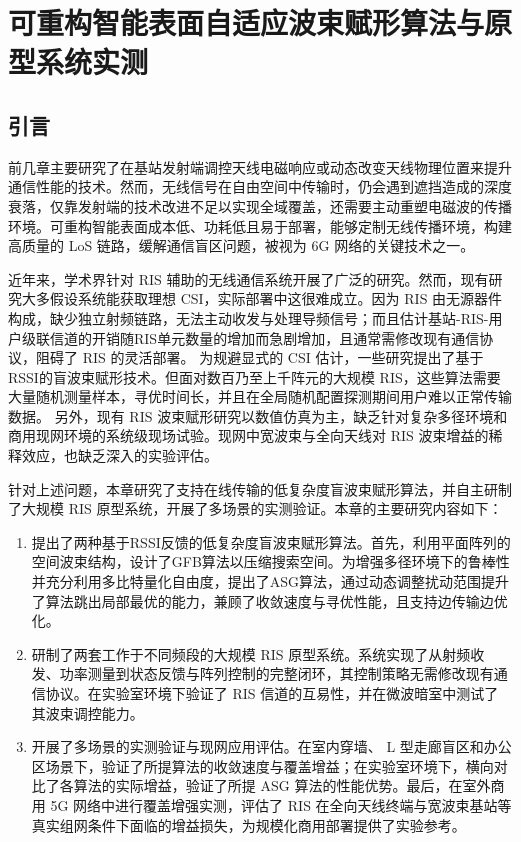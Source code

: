 \chapter{可重构智能表面自适应波束赋形算法与原型系统实测}\label{ch:ris}

\section{引言}\label{sec:ris_intro}

前几章主要研究了在基站发射端调控天线电磁响应或动态改变天线物理位置来提升通信性能的技术。然而，无线信号在自由空间中传输时，仍会遇到遮挡造成的深度衰落，仅靠发射端的技术改进不足以实现全域覆盖，还需要主动重塑电磁波的传播环境。可重构智能表面成本低、功耗低且易于部署，能够定制无线传播环境，构建高质量的 LoS 链路，缓解通信盲区问题，被视为 6G 网络的关键技术之一。

近年来，学术界针对 RIS 辅助的无线通信系统开展了广泛的研究。然而，现有研究大多假设系统能获取理想 CSI，实际部署中这很难成立。因为 RIS 由无源器件构成，缺少独立射频链路，无法主动收发与处理导频信号；而且估计基站-RIS-用户级联信道的开销随RIS单元数量的增加而急剧增加，且通常需修改现有通信协议，阻碍了 RIS 的灵活部署。
为规避显式的 CSI 估计，一些研究提出了基于RSSI的盲波束赋形技术\cite{arun2020rfocus,ren2023configuring}。但面对数百乃至上千阵元的大规模 RIS，这些算法需要大量随机测量样本，寻优时间长，并且在全局随机配置探测期间用户难以正常传输数据。
另外，现有 RIS 波束赋形研究以数值仿真为主，缺乏针对复杂多径环境和商用现网环境的系统级现场试验。现网中宽波束与全向天线对 RIS 波束增益的稀释效应，也缺乏深入的实验评估。

针对上述问题，本章研究了支持在线传输的低复杂度盲波束赋形算法，并自主研制了大规模 RIS 原型系统，开展了多场景的实测验证。本章的主要研究内容如下：

\begin{enumerate}
	\item 提出了两种基于RSSI反馈的低复杂度盲波束赋形算法。首先，利用平面阵列的空间波束结构，设计了GFB算法以压缩搜索空间。为增强多径环境下的鲁棒性并充分利用多比特量化自由度，提出了ASG算法，通过动态调整扰动范围提升了算法跳出局部最优的能力，兼顾了收敛速度与寻优性能，且支持边传输边优化。
	
	\item 研制了两套工作于不同频段的大规模 RIS 原型系统。系统实现了从射频收发、功率测量到状态反馈与阵列控制的完整闭环，其控制策略无需修改现有通信协议。在实验室环境下验证了 RIS 信道的互易性，并在微波暗室中测试了其波束调控能力。
	
	\item 开展了多场景的实测验证与现网应用评估。在室内穿墙、 L 型走廊盲区和办公区场景下，验证了所提算法的收敛速度与覆盖增益；在实验室环境下，横向对比了各算法的实际增益，验证了所提 ASG 算法的性能优势。最后，在室外商用 5G 网络中进行覆盖增强实测，评估了 RIS 在全向天线终端与宽波束基站等真实组网条件下面临的增益损失，为规模化商用部署提供了实验参考。
\end{enumerate}

